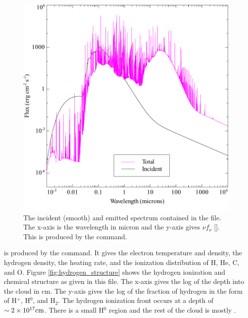 \documentclass[12pt,twoside]{article}
\begin{document}
{\begin{figure}
\begin{center}
\includegraphics[clip=on,width=0.8\columnwidth,height=0.8\textheight,keepaspectratio]{orion_hii_pdr_pp_con}
\end{center}
\caption{The incident (smooth) and emitted spectrum contained in the
 file.  The
x-axis is the wavelength in micron and
the y-axis gives $\nu f_\nu$ [\ergpscmps ].  This is produced by the
 command.}
\label{fig:orion_hii_pdr_pp_con}
\end{figure}

 is produced
by the  command.  It gives
the electron temperature and density, the hydrogen density, the heating
rate, and the ionization distribution of H, He, C, and O.
Figure \ref{fig:hydrogen_structure} shows the hydrogen ionization
and chemical structure as given in this file.
The x-axis gives the log of the depth into the cloud in cm.
The y-axis gives the log of the fraction of hydrogen in the form of H$^+$,
H$^0$, and H$_2$.
The hydrogen ionization
front occurs at a depth of $\sim 2 \times 10^{17} \rm{cm}$.
There is a small H$^0$ region and the rest of the cloud is mostly \htwo .

}
\end{document}
